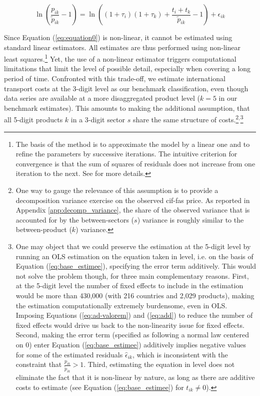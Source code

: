 \documentclass[a4paper,11pt]{article}
\begin{document}
\begin{equation}
\ln\left(\frac{p_{ik}}{\widetilde{p}_{ik}}-1 \right)= \ln \left((1+\tau_{i})(1+\tau_{k})+\frac{t_{i} + t_{k}}{\widetilde{p}_{ik}}-1 \right) + \epsilon_{ik} \label{eq:equation0}
\end{equation}

Since Equation (\ref{eq:equation0}) is non-linear, it cannot be estimated using standard linear estimators. All estimates are thus performed using non-linear least squares.\footnote{The basis of the method is to approximate the model by a linear one and to refine the parameters by successive iterations. The intuitive criterion for convergence is that the sum of squares of residuals does not increase from one iteration to the next.
See \cite{Woolridge-Book-2001} for more details.} Yet, the use of a non-linear estimator triggers computational limitations that limit the level of possible detail, especially when covering a long period of time.
Confronted with this trade-off, we estimate international transport costs at the 3-digit level as our benchmark classification, even though data series are available at a more disaggregated product level ($k=5$ in our benchmark estimates). This amounts to making the additional assumption, that all 5-digit products $k$ in a 3-digit sector $s$ share the same structure of costs.\footnote{One way to gauge the relevance of this assumption is to provide a decomposition variance exercise on the observed cif-fas price.
As reported in Appendix \ref{app:decomp_variance}, the share of the observed variance that is accounted for by the between-sectors ($s$) variance is roughly similar to the between-product ($k$) variance.}$^{,}$\footnote{One may object that we could preserve the estimation at the 5-digit level by running an OLS estimation on the equation taken in level, i.e.
on the basis of Equation (\ref{eq:base_estimee}), specifying the error term additively.
This would not solve the problem though, for three main complementary reasons.
First, at the 5-digit level the number of fixed effects to include in the estimation would be more than 430,000 (with 216 countries and 2,029 products), making the estimation computationally extremely burdensome, even in OLS.
Imposing Equations (\ref{eq:ad-valorem}) and (\ref{eq:add}) to reduce the number of fixed effects would drive us back to the non-linearity issue for fixed effects.
Second, making the error term (specified as following a normal law centered on 0) enter Equation (\ref{eq:base_estimee}) additively implies negative values for some of the estimated residuals $\widehat{\epsilon}_{ik}$, which is inconsistent with the constraint that $\frac{p_{ik}}{\widetilde{p}_{ik}}>1$.
Third, estimating the equation in level does not eliminate the fact that it is non-linear by nature, as long as there are additive costs to estimate (see Equation (\ref{eq:base_estimee}) for $t_{ik} \neq 0$).}
\end{document}
